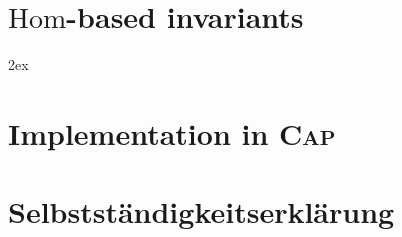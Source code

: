 \documentclass[a4paper,12pt]{article}
\begin{document}
\newpage
\section{$\mathrm{Hom}$-based invariants}




\newpage

\begingroup
     \parindent 0pt
     \parskip 2ex
     \def\enotesize{\normalsize}
     \theendnotes
\endgroup 



\appendix
\renewcommand{\thesection}{\Alph{section}}
\section{Implementation in \textsc{Cap}}


\newpage
\section{Selbstst\"andigkeitserkl\"arung}

\end{document}
